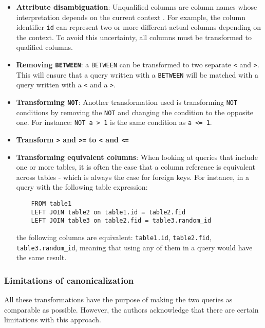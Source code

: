\begin{itemize}
    \item \textbf{Attribute disambiguation}: Unqualified columns are column names whose interpretation depends on the current context \citep{mysql:documentation}. For example, the column identifier \texttt{id} can represent two or more different actual columns depending on the context. To avoid this uncertainty, all columns must be transformed to qualified columns.
    \item \textbf{Removing \texttt{BETWEEN}}: a \texttt{BETWEEN} can be transformed to two separate \texttt{<} and \texttt{>}. This will ensure that a query written with a \texttt{BETWEEN} will be matched with a query written with a \texttt{<} and a \texttt{>}.
    \item \textbf{Transforming \texttt{NOT}}: Another transformation used is transforming \texttt{NOT} conditions by removing the \texttt{NOT} and changing the condition to the opposite one. For instance: \texttt{NOT a > 1} is the same condition as \texttt{a <= 1}.
    \item \textbf{Transform \texttt{>} and \texttt{>=} to \texttt{<} and \texttt{<=}}
    \item \textbf{Transforming equivalent columns}: When looking at queries that include one or more tables, it is often the case that a column reference is equivalent across tables - which is always the case for foreign keys. For instance, in a query with the following table expression: \begin{verbatim}
    FROM table1
    LEFT JOIN table2 on table1.id = table2.fid
    LEFT JOIN table3 on table2.fid = table3.random_id
    \end{verbatim}
    the following columns are equivalent: \texttt{table1.id}, \texttt{table2.fid}, \texttt{table3.random_id}, meaning that using any of them in a query would have the same result.
\end{itemize}

\subsubsection{Limitations of canonicalization}

All these transformations have the purpose of making the two queries as comparable as possible. However, the authors acknowledge that there are certain limitations with this approach.


